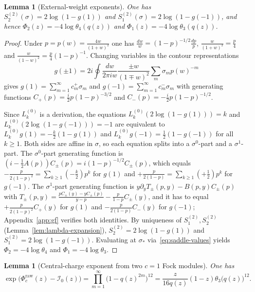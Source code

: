 \documentclass[twoside,10pt]{article}
\numberwithin{equation}{section}
\theoremstyle{slbody}
\newtheorem{lemma}[theorem]{Lemma}
\theoremstyle{definition}
\theoremstyle{remark}
\begin{document}
\begin{lemma}[External-weight exponents]\label{lem:ext-exponents}
One has \(S^{(2)}_2(\sigma)=2\log(1-g(1))\) and
\(S^{(2)}_1(\sigma)=2\log(1-g(-1))\), and hence
\(\Phi_2(z)=-4\log\theta_4(q(z))\) and \(\Phi_1(z)=-4\log\theta_3(q(z))\).
\end{lemma}

\begin{proof}
Under \(p=p(w)=\frac{4w}{(1+w)^2}\) one has
\(\frac{dw}{w}=(1-p)^{-1/2}\frac{dp}{p}\), \(\frac{w}{(1+w)^2}=\frac{p}{4}\) and
\(\frac{w}{(1-w)^2}=\frac{p}{4}(1-p)^{-1}\).  Changing variables in the
contour representations
\[
 g(\pm1)=2i\oint\frac{dw}{2\pi i w}\frac{\pm w}{(1\mp w)^2}\sum_m\sigma_m p(w)^{-m}
\]
gives
\(g(1)=\sum_{m=1}^\infty c^+_m\sigma_m\) and
\(g(-1)=\sum_{m=1}^\infty c^-_m\sigma_m\) with generating functions
\(C_+(p)=\frac{i}{2}p(1-p)^{-3/2}\) and
\(C_-(p)=-\frac{i}{2}p(1-p)^{-1/2}\).

Since \(L_k^{(0)}\) is a derivation, the equations
\(L_k^{(0)}(2\log(1-g(1)))=k\) and \(L_k^{(0)}(2\log(1-g(-1)))=-1\) are
equivalent to \(L_k^{(0)}g(1)=-\frac{k}{2}(1-g(1))\) and
\(L_k^{(0)}g(-1)=\frac12(1-g(-1))\) for all \(k\geq1\).  Both sides are
affine in \(\sigma\), so each equation splits into a \(\sigma^0\)-part and a
\(\sigma^1\)-part.  The \(\sigma^0\)-part generating function is
\((i-\frac12 A(p))C_\pm(p)=i(1-p)^{-1/2}C_\pm(p)\), which equals
\(-\frac{p}{2(1-p)^2}=\sum_{k\geq1}(-\frac{k}{2})p^k\) for \(g(1)\) and
\(+\frac{p}{2(1-p)}=\sum_{k\geq1}(+\frac12)p^k\) for \(g(-1)\).  The
\(\sigma^1\)-part generating function is \(y\partial_yT_\pm(p,y)-B(p,y)C_\pm(p)\)
with \(T_\pm(p,y)=\frac{pC_\pm(y)-yC_\pm(p)}{y-p}-\frac{p}{1-p}C_\pm(y)\), and it
has to equal \(+\frac{p}{2(1-p)^2}C_+(y)\) for \(g(1)\) and
\(-\frac{p}{2(1-p)}C_-(y)\) for \(g(-1)\); Appendix~\ref{app:gf} verifies
both identities.  By uniqueness of \(S^{(2)}_1,S^{(2)}_2\) (Lemma~\ref{lem:lambda-expansion}),
\(S^{(2)}_2=2\log(1-g(1))\) and \(S^{(2)}_1=2\log(1-g(-1))\).  Evaluating
at \(\sigma_*\) via~\eqref{eq:saddle-values} yields \(\Phi_2=-4\log\theta_4\)
and \(\Phi_1=-4\log\theta_3\).
\end{proof}

\begin{lemma}[Central-charge exponent from two \(c=1\) Fock modules]\label{lem:central-charge}
One has
\[
 \exp\bigl(\Phi_c^{\mathrm{raw}}(z)-\mathcal I_0(z)\bigr)
 =\prod_{m=1}^\infty\bigl(1-q(z)^{2m}\bigr)^{12}
 =\frac{z}{16q(z)}(1-z)\theta_3\bigl(q(z)\bigr)^{12}.
\]
\end{lemma}
\end{document}

